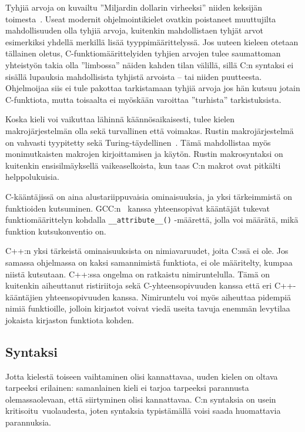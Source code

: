 Tyhjiä arvoja on kuvailtu ''Miljardin dollarin virheeksi'' niiden keksijän
toimesta~\citep{billiondollars}. Useat modernit ohjelmointikielet ovatkin
poistaneet muuttujilta mahdollisuuden olla tyhjiä arvoja, kuitenkin
mahdollistaen tyhjät arvot esimerkiksi yhdellä merkillä lisää
tyyppimäärittelyssä. Jos uuteen kieleen otetaan tällainen oletus,
C-funktiomäärittelyiden tyhjien arvojen tulee saumattoman yhteistyön takia olla
''limbossa'' näiden kahden tilan välillä, sillä C:n syntaksi ei sisällä
lupauksia mahdollisista tyhjistä arvoista -- tai niiden puutteesta. Ohjelmoijaa
siis ei tule pakottaa tarkistamaan tyhjiä arvoja jos hän kutsuu jotain
C-funktiota, mutta toisaalta ei myöskään varoittaa ''turhista'' tarkistuksista.

Koska kieli voi vaikuttaa lähinnä käännösaikaisesti, tulee kielen
makrojärjestelmän olla sekä turvallinen että voimakas. Rustin makrojärjestelmä
on vahvasti tyypitetty sekä Turing-täydellinen~\citep{rustmacros}. Tämä
mahdollistaa myös monimutkaisten makrojen kirjoittamisen ja käytön. Rustin
makrosyntaksi on kuitenkin ensisilmäyksellä vaikeaselkoista, kun taas C:n
makrot ovat pitkälti helppolukuisia.

C-kääntäjissä on aina alustariippuvaisia ominaisuuksia, ja yksi tärkeimmistä on
funktioiden kutsuminen. GCC:n~\citep{gcc} kanssa yhteensopivat kääntäjät
tukevat funktiomäärittelyn kohdalla \texttt{\_\_attribute\_\_()} -määrettä,
jolla voi määrätä, mikä funktion kutsukonventio on.

C++:n yksi tärkeistä ominaisuuksista on nimiavaruudet, joita C:ssä ei ole. Jos
samassa ohjelmassa on kaksi samannimistä funktiota, ei ole määritelty, kumpaa
niistä kutsutaan. C++:ssa ongelma on ratkaistu nimiruntelulla. Tämä on
kuitenkin aiheuttanut ristiriitoja sekä C-yhteensopivuuden kanssa että eri
C++-kääntäjien yhteensopivuuden kanssa. Nimiruntelu voi myös aiheuttaa pidempiä
nimiä funktioille, jolloin kirjastot voivat viedä useita tavuja enemmän
levytilaa jokaista kirjaston funktiota kohden.

\subsection{Syntaksi}

Jotta kielestä toiseen vaihtaminen olisi kannattavaa, uuden kielen on oltava
tarpeeksi erilainen: samanlainen kieli ei tarjoa tarpeeksi parannusta
olemassaolevaan, että siirtyminen olisi kannattavaa. C:n syntaksia on usein
kritisoitu\citationneeded~vuolaudesta, joten syntaksia typistämällä voisi saada
huomattavia parannuksia.

